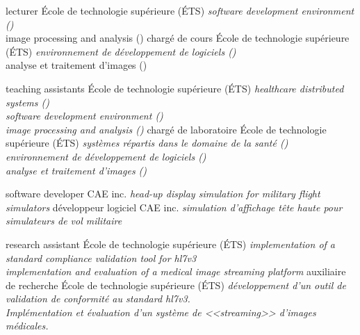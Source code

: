 \documentclass[print]{friggeri-cv}
\begin{document}

\begin{entrylist}
  \engfr
  { {lecturer} {École de technologie supérieure {\scriptsize (ÉTS)}} {\emph{software development environment (\eleenv)}\\image processing and analysis (\eletr) }}
  { {chargé de cours} {École de technologie supérieure {\scriptsize (ÉTS)}} {\emph{environnement de développement de logiciels (\eleenv)}\\analyse et traitement d'images (\eletr)}}

  \engfr
  { {teaching assistants} {École de technologie supérieure {\scriptsize (ÉTS)}} {\emph{healthcare distributed systems (\gtssys)\\software development environment (\eleenv)\\image processing and analysis (\eletr)}}}
  { {chargé de laboratoire} {École de technologie supérieure {\scriptsize (ÉTS)}} {\emph{systèmes répartis dans le domaine de la santé (\gtssys)\\environnement de développement de logiciels (\eleenv)\\analyse et traitement d'images (\eletr)}}}

  \engfr
  { {software developer} {\scriptsize{CAE} inc.} {\emph{head-up display simulation for military flight simulators}}}
  { {développeur logiciel} {\scriptsize{CAE} inc.} {\emph{simulation d'affichage tête haute pour simulateurs de vol militaire}}}

  \engfr
  { {research assistant} {École de technologie supérieure {\scriptsize (ÉTS)}} {\emph{implementation of a standard compliance validation tool for hl{\small7}v{\small3}\\implementation and evaluation of a medical image streaming platform}}}
  { {auxiliaire de recherche} {École de technologie supérieure {\scriptsize (ÉTS)}} {\emph{développement d'un outil de validation de conformité au standard hl{\small7}v{\small3}.\\Implémentation et évaluation d'un système de <<streaming>> d'images médicales.}}}
\end{entrylist}
\end{document}

